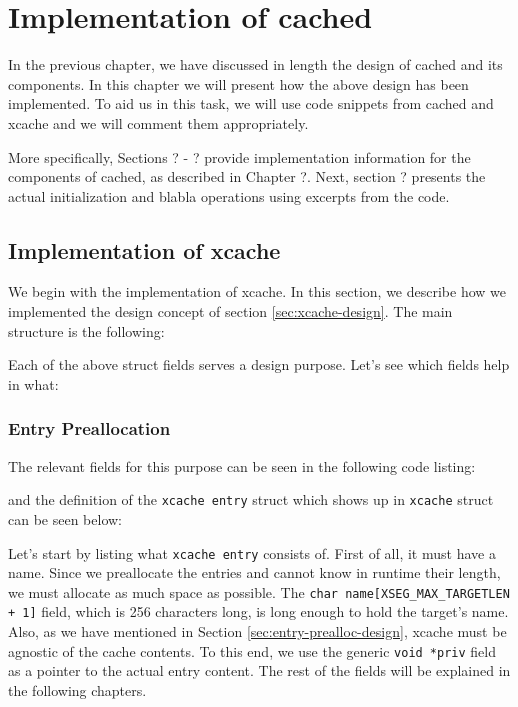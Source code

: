 \chapter{Implementation of cached}\label{ch:cached-implementation}

In the previous chapter, we have discussed in length the design of cached and 
its components. In this chapter we will present how the above design has been
implemented. To aid us in this task, we will use code snippets from cached and 
xcache and we will comment them appropriately.

More specifically, Sections ? - ? provide implementation information for the 
components of cached, as described in Chapter ?. Next, section ? presents the 
actual initialization and blabla operations using excerpts from the code.

\section{Implementation of xcache}

We begin with the implementation of xcache.  In this section, we describe how 
we implemented the design concept of section \ref{sec:xcache-design}. The main 
\xcache structure is the following:


Each of the above \xcache struct fields serves a design purpose.
Let's see which fields help in what:

\subsection{Entry Preallocation}

The relevant fields for this purpose can be seen in the following code listing:


and the definition of the \texttt{xcache entry} struct which shows up in 
\texttt{xcache} struct can be seen below:


Let's start by listing what \texttt{xcache entry} consists of. First of all, it 
must have a name. Since we preallocate the entries and cannot know in runtime 
their length, we must allocate as much space as possible. The \texttt{char 
	name[XSEG\_MAX\_TARGETLEN + 1]} field, which is 256 characters long, is 
long enough to hold the target's name. Also, as we have mentioned in Section 
\ref{sec:entry-prealloc-design}, xcache must be agnostic of the cache contents.  
To this end, we use the generic \texttt{void *priv} field as a pointer to the 
actual entry content. The rest of the fields will be explained in the following 
chapters.

